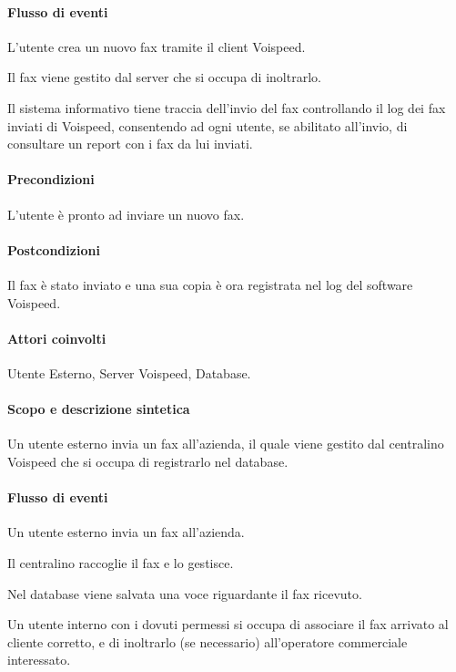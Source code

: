 \paragraph{Flusso di eventi}
\begin{elenconumerato}[\textbf{}]{\subsubsecindent}
\item L'utente crea un nuovo fax tramite il client Voispeed.
\item Il fax viene gestito dal server che si occupa di inoltrarlo.
\item Il sistema informativo tiene traccia dell'invio del fax controllando il log dei fax inviati di Voispeed, consentendo ad ogni utente, se abilitato all'invio, di consultare un report con i fax da lui inviati.
\end{elenconumerato}
\paragraph{Precondizioni} L'utente \` e pronto ad inviare un nuovo fax.
\paragraph{Postcondizioni} Il fax \` e  stato inviato e una sua copia \` e ora registrata nel log del software Voispeed.

\paragraph{Attori coinvolti} Utente Esterno, Server Voispeed, Database.
\paragraph{Scopo e descrizione sintetica}
Un utente esterno invia un fax all'azienda, il quale viene gestito dal centralino Voispeed che si occupa di registrarlo nel database.
\paragraph{Flusso di eventi}
\begin{elenconumerato}[\textbf{}]{\subsubsecindent}
\item Un utente esterno invia un fax all'azienda.
\item Il centralino raccoglie il fax e lo gestisce.
\item Nel database viene salvata una voce riguardante il fax ricevuto.
\item Un utente interno con i dovuti permessi si occupa di associare il fax arrivato al cliente corretto, e di inoltrarlo (se necessario) all'operatore commerciale interessato.
\end{elenconumerato}
